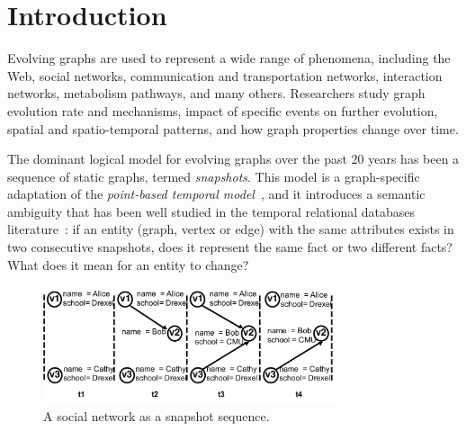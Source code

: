 \section{Introduction}
\label{sec:intro}

Evolving graphs are used to represent a wide range of phenomena,
including the Web, social networks, communication and transportation
networks, interaction networks, metabolism pathways, and many others.
Researchers study graph evolution rate and mechanisms, impact of
specific events on further evolution, spatial and spatio-temporal
patterns, and how graph properties change over time.  

The dominant logical model for evolving graphs over the past 20 years
has been a sequence of static graphs, termed {\em snapshots}.  This
model is a graph-specific adaptation of the {\em point-based temporal
  model}~\cite{Toman2009}, and it introduces a semantic ambiguity that
has been well studied in the temporal relational databases
literature~\cite{Bohlen1998}: if an entity (graph, vertex or edge)
with the same attributes exists in two consecutive snapshots, does it
represent the same fact or two different facts?  What does it mean for
an entity to change?

\begin{figure}[t!]
\includegraphics[width=3.4in]{figs/T1_graphs.pdf}
\vspace{-0.7cm}
\caption{A social network as a snapshot sequence.}
\vspace{-0.5cm}
\label{fig:snapshots}
\end{figure}


